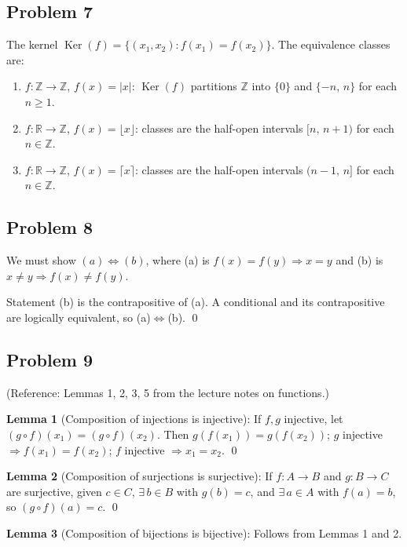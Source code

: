 \subsection*{Problem 7}
The kernel $\operatorname{Ker}(f)=\{(x_1,x_2): f(x_1)=f(x_2)\}$. The equivalence classes are:
\begin{enumerate}[label=(\alph*), nosep]
  \item $f:\mathbb{Z}\to\mathbb{Z}$, $f(x)=|x|$:\; $\operatorname{Ker}(f)$ partitions $\mathbb{Z}$ into $\{0\}$ and $\{-n,\,n\}$ for each $n\geq 1$.
  \item $f:\mathbb{R}\to\mathbb{Z}$, $f(x)=\lfloor x\rfloor$:\; classes are the half-open intervals $[n,\,n+1)$ for each $n\in\mathbb{Z}$.
  \item $f:\mathbb{R}\to\mathbb{Z}$, $f(x)=\lceil x\rceil$:\; classes are the half-open intervals $(n-1,\,n]$ for each $n\in\mathbb{Z}$.
\end{enumerate}

\subsection*{Problem 8}
We must show $(a)\Leftrightarrow(b)$, where (a) is $f(x)=f(y)\Rightarrow x=y$ and (b) is $x\neq y\Rightarrow f(x)\neq f(y)$.

Statement (b) is the contrapositive of (a). A conditional and its contrapositive are logically equivalent, so (a)$\Leftrightarrow$(b). \qed

\subsection*{Problem 9}
(Reference: Lemmas 1, 2, 3, 5 from the lecture notes on functions.)

\textbf{Lemma 1} (Composition of injections is injective): If $f,g$ injective, let $(g\circ f)(x_1)=(g\circ f)(x_2)$. Then $g(f(x_1))=g(f(x_2))$; $g$ injective $\Rightarrow f(x_1)=f(x_2)$; $f$ injective $\Rightarrow x_1=x_2$. \qed

\textbf{Lemma 2} (Composition of surjections is surjective): If $f:A\to B$ and $g:B\to C$ are surjective, given $c\in C$, $\exists\, b\in B$ with $g(b)=c$, and $\exists\, a\in A$ with $f(a)=b$, so $(g\circ f)(a)=c$. \qed

\textbf{Lemma 3} (Composition of bijections is bijective): Follows from Lemmas 1 and 2.

